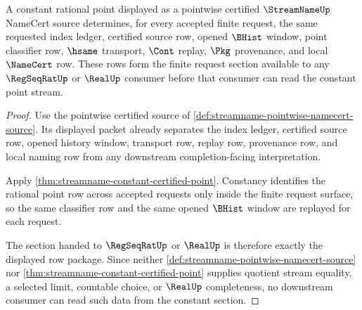 \begin{theorem}
\label{thm:streamname-pointwise-certified-source-constant-section}
A constant rational point displayed as a pointwise certified $\StreamNameUp$ NameCert source determines, for every accepted finite request, the same requested index ledger, certified source row, opened $\BHist$ window, point classifier row, $\hsame$ transport, $\Cont$ replay, $\Pkg$ provenance, and local $\NameCert$ row. These rows form the finite request section available to any $\RegSeqRatUp$ or $\RealUp$ consumer before that consumer can read the constant point stream.
\end{theorem}
\begin{proof}
Use the pointwise certified source of \autoref{def:streamname-pointwise-namecert-source}. Its displayed packet already separates the index ledger, certified source row, opened history window, transport row, replay row, provenance row, and local naming row from any downstream completion-facing interpretation.

Apply \autoref{thm:streamname-constant-certified-point}. Constancy identifies the rational point row across accepted requests only inside the finite request surface, so the same classifier row and the same opened $\BHist$ window are replayed for each request.

The section handed to $\RegSeqRatUp$ or $\RealUp$ is therefore exactly the displayed row package. Since neither \autoref{def:streamname-pointwise-namecert-source} nor \autoref{thm:streamname-constant-certified-point} supplies quotient stream equality, a selected limit, countable choice, or $\RealUp$ completeness, no downstream consumer can read such data from the constant section.
\end{proof}


